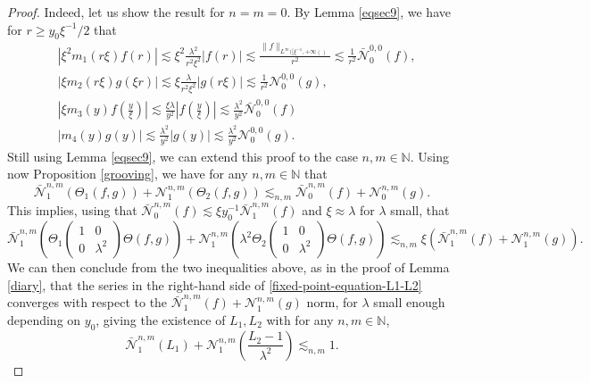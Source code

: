 \documentclass[11 pt]{amsart}
\theoremstyle{definition}
\theoremstyle{remark}
\numberwithin{equation}{section}
\begin{document}
\begin{proof}
  Indeed, let us show the result for $n = m = 0$. By Lemma \ref{eqsec9}, we
  have for $r \geqslant y_0\xi^{- 1}/2$ that
\begin{align*}
& | \xi^2 m_1 (r \xi) f (r) | \lesssim \xi^2 \frac{\lambda^2}{r^2 \xi^2} |
     f (r) | \lesssim \frac{\| f \|_{L^{\infty} ([\xi^{- 1}, + \infty
     ()}}{r^2} \lesssim \frac{1}{r^2} \bar{\mathcal{N}}_0^{0, 0} (f), \\
&  | \xi m_2 (r \xi) g (\xi r) | \lesssim \xi \frac{\lambda}{r^2 \xi^2} | g(r \xi) | \lesssim \frac{1}{r^2} \mathcal{N}_0^{0, 0} (g), \\
& \left| \xi m_3 (y) f \left( \frac{y}{\xi} \right) \right| \lesssim
     \frac{\xi \lambda}{y^2} \left| f \left( \frac{y}{\xi} \right) \right|
     \lesssim \frac{\lambda^2}{y^2} \bar{\mathcal{N}}_0^{0, 0} (f) \\
& | m_4 (y) g (y) | \lesssim \frac{\lambda^2}{y^2} | g (y) | \lesssim
     \frac{\lambda^2}{y^2} \mathcal{N}_0^{0, 0} (g) .
\end{align*}
  Still using Lemma \ref{eqsec9}, we can extend this proof to the case $n, m
  \in \mathbb{N}$. Using now Proposition \ref{grooving}, we have for any $n, m
  \in \mathbb{N}$ that
  \[ \bar{\mathcal{N}}_1^{n, m} (\Theta_1 (f, g)) +\mathcal{N}_1^{n, m}
     (\Theta_2 (f, g)) \lesssim_{n, m} \bar{\mathcal{N}}_0^{n, m} (f)
     +\mathcal{N}_0^{n, m} (g) . \]
     This implies, using that $\bar{\mathcal{N}}_0^{n, m} (f)\lesssim \xi y_0^{-1}\bar{\mathcal{N}}_1^{n, m} (f)$ and $\xi\approx \lambda$ for $\lambda$ small, that
  \[ \bar{\mathcal{N}}_1^{n, m}\left( \Theta_1 \begin{pmatrix} 1 & 0 \\ 0 & \lambda^2 \end{pmatrix}\Theta (f, g) \right)+\mathcal{N}_1^{n, m}\left(\lambda^2 \Theta_2 \begin{pmatrix} 1 & 0 \\ 0 & \lambda^2 \end{pmatrix}\Theta (f, g) \right) \lesssim_{n, m} \xi (\bar{\mathcal{N}}_1^{n, m} (f)+\mathcal{N}_1^{n, m} (g)). \]
  We can then conclude from the two inequalities above, as in the proof of Lemma \ref{diary}, that the series in the right-hand side of \eqref{fixed-point-equation-L1-L2} converges with respect to the $\bar{\mathcal{N}}_1^{n, m}(f)+\mathcal{N}_1^{n, m} (g)$ norm, for $\lambda$ small enough depending on $y_0$, giving the existence of $L_1, L_2$ with for any $n, m \in \mathbb{N}$,
  \[ \bar{\mathcal{N}}_1^{n, m} (L_1) +\mathcal{N}_1^{n, m} \left( \frac{L_2 -
     1}{\lambda^2} \right) \lesssim_{n, m} 1. \]

\end{proof}
\end{document}
